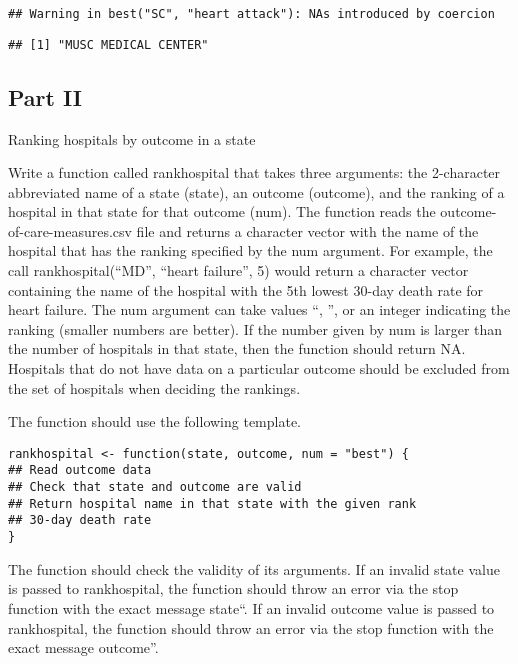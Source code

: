 \documentclass[]{article}
\begin{document}
\begin{verbatim}
## Warning in best("SC", "heart attack"): NAs introduced by coercion
\end{verbatim}

\begin{verbatim}
## [1] "MUSC MEDICAL CENTER"
\end{verbatim}

\subsection{\texorpdfstring{\textbf{Part II}}{Part II}}\label{part-ii}

Ranking hospitals by outcome in a state

Write a function called rankhospital that takes three arguments: the
2-character abbreviated name of a state (state), an outcome (outcome),
and the ranking of a hospital in that state for that outcome (num). The
function reads the outcome-of-care-measures.csv file and returns a
character vector with the name of the hospital that has the ranking
specified by the num argument. For example, the call
rankhospital(``MD'', ``heart failure'', 5) would return a character
vector containing the name of the hospital with the 5th lowest 30-day
death rate for heart failure. The num argument can take values \best``,
\worst'', or an integer indicating the ranking (smaller numbers are
better). If the number given by num is larger than the number of
hospitals in that state, then the function should return NA. Hospitals
that do not have data on a particular outcome should be excluded from
the set of hospitals when deciding the rankings.

The function should use the following template.

\begin{verbatim}
rankhospital <- function(state, outcome, num = "best") {
## Read outcome data
## Check that state and outcome are valid
## Return hospital name in that state with the given rank
## 30-day death rate
}
\end{verbatim}

The function should check the validity of its arguments. If an invalid
state value is passed to rankhospital, the function should throw an
error via the stop function with the exact message \invalid state``. If
an invalid outcome value is passed to rankhospital, the function should
throw an error via the stop function with the exact message
\invalid outcome''.
\end{document}
